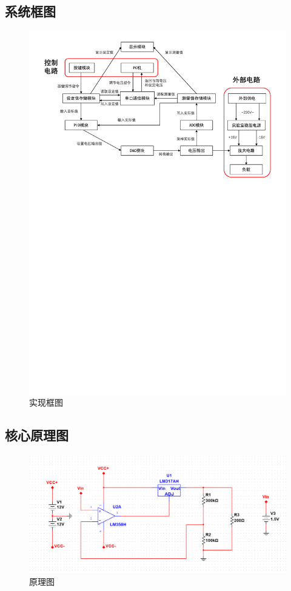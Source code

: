 \documentclass[a4paper]{article}
\theoremstyle{definition}
\theoremstyle{plain}
\theoremstyle{remark}
\begin{document}
\subsection{系统框图}
\begin{figure}[H]
	\centering
	\includegraphics[width=1.1\textwidth]{实现框图}
	\caption{实现框图}
\end{figure}
\subsection{核心原理图}
\vspace*{-2em}
\begin{figure}[H]
	\centering
	\includegraphics[width=1\textwidth]{原理图}
	\caption{原理图}
\end{figure}
\end{document}

